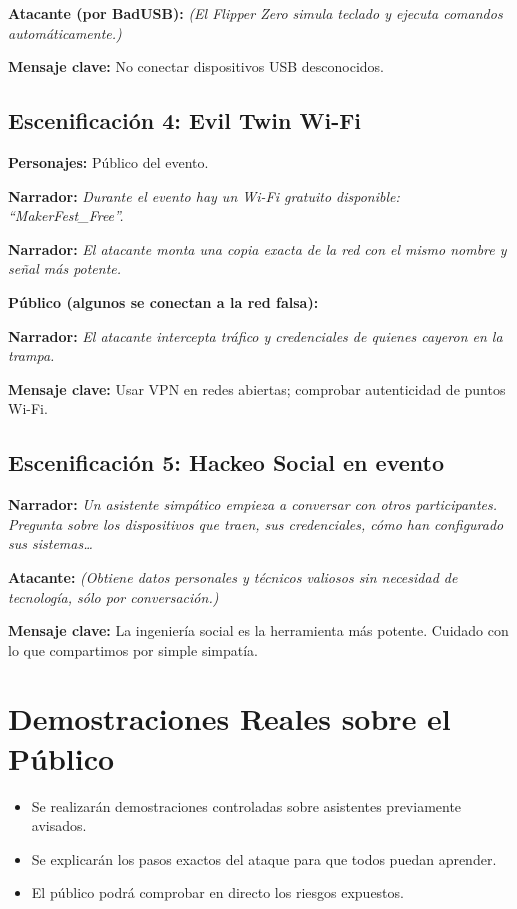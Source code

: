 \documentclass[a4paper,12pt]{article}
\begin{document}
\textbf{Atacante (por BadUSB):} 
\textit{(El Flipper Zero simula teclado y ejecuta comandos automáticamente.)}

\textbf{Mensaje clave:} No conectar dispositivos USB desconocidos.

\subsection*{Escenificación 4: Evil Twin Wi-Fi}

\textbf{Personajes:} Público del evento.

\textbf{Narrador:} 
\textit{Durante el evento hay un Wi-Fi gratuito disponible: “MakerFest\_Free”.}

\textbf{Narrador:} 
\textit{El atacante monta una copia exacta de la red con el mismo nombre y señal más potente.}

\textbf{Público (algunos se conectan a la red falsa):} 

\textbf{Narrador:} 
\textit{El atacante intercepta tráfico y credenciales de quienes cayeron en la trampa.}

\textbf{Mensaje clave:} Usar VPN en redes abiertas; comprobar autenticidad de puntos Wi-Fi.

\subsection*{Escenificación 5: Hackeo Social en evento}

\textbf{Narrador:} 
\textit{Un asistente simpático empieza a conversar con otros participantes. Pregunta sobre los dispositivos que traen, sus credenciales, cómo han configurado sus sistemas…}

\textbf{Atacante:} 
\textit{(Obtiene datos personales y técnicos valiosos sin necesidad de tecnología, sólo por conversación.)}

\textbf{Mensaje clave:} La ingeniería social es la herramienta más potente. Cuidado con lo que compartimos por simple simpatía.

\section{Demostraciones Reales sobre el Público}

\begin{itemize}
    \item Se realizarán demostraciones controladas sobre asistentes previamente avisados.
    \item Se explicarán los pasos exactos del ataque para que todos puedan aprender.
    \item El público podrá comprobar en directo los riesgos expuestos.
\end{itemize}
\end{document}
